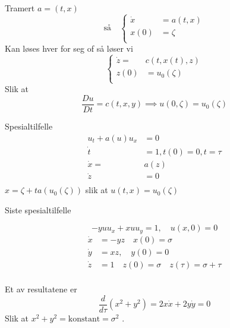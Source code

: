 \documentclass{article}
\theoremstyle{remark}
\newcommand{\newpara}
  {
  \vskip 0.4cm
  }
\begin{document}
  \newpara
  Tramert $a = \left( t,x \right)$ \[
    \text{så} \quad  \begin{cases}
      \dot{x} &=  a\left( t,x \right) \\
      x\left( 0 \right) &=  \zeta  \\
    \end{cases} 
  \] 
  Kan løses hver for seg of så løser vi \[
  \begin{cases}
    \dot{z} =  &  c\left( t,x\left( t \right) , z \right) \\
    z\left( 0 \right) &=  u_{0}\left( \zeta  \right) \\
  \end{cases}
  \] 
  Slik at \[
  \frac{Du}{Dt}  = c\left( t,x,y \right) \implies  u\left( 0,\zeta  \right) = u_{0}\left( \zeta  \right)
  \] 

  
  \newpara
  Spesialtilfelle
  \[
  \begin{split}
    u_{t} + a\left( u \right) u_{x} &= 0 \\
    \dot{t}  & = 1, t\left( 0 \right) = 0, t = \tau  \\
    \dot{x} = &  a\left( z \right) \\
    \dot{z} &= 0 \\
  \end{split} 
  \] 
  $x = \zeta + t a\left( u_{0} \left( \zeta  \right) \right)$ slik at $u\left( t,x \right) = u_{0}\left( \zeta  \right)$

  
  \newpara
  Siste spesialtilfelle
  
  \newpara
  \[
  -y u u_{x} + xu u_{y} = 1  , \quad  u \left( x,0 \right) =0 
  \] 
  \[
  \begin{split}
    \dot{x} &=  -yz \quad  x\left( 0 \right) = \sigma   \\
    \dot{y} &= xz , \quad  y\left( 0 \right) = 0  \\
    \dot{z} &= 1 \quad z\left( 0 \right) = \sigma \quad  z\left( \tau  \right) = \sigma + \tau     \\
  \end{split} 
  \] 

  Et av resultatene er \[
  \frac{d }{d \tau }  \left( x^2 + y^2 \right) = 2x \dot{x} + 2y \dot{y} = 0
  \] 
  Slik at $x^2 + y^2 = \text{konstant} = \sigma ^2$ . 
  
\end{document}
